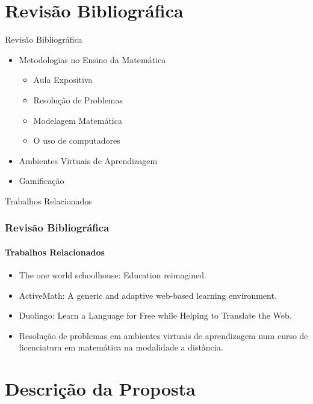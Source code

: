 \documentclass[aspectratio=169]{beamer}
\begin{document}
\section{Revisão Bibliográfica}

\begin{frame}{Revisão Bibliográfica}
  \begin{itemize}
  	\item Metodologias no Ensino da Matemática
    	\begin{itemize}
        	\item Aula Expositiva
            \item Resolução de Problemas
            \item Modelagem Matemática
            \item O uso de computadores
        \end{itemize}
    \item Ambientes Virtuais de Aprendizagem
    \item Gamificação 
  \end{itemize}
\end{frame}

\begin{frame}{Trabalhos Relacionados}
\frametitle{Revisão Bibliográfica}
\framesubtitle{Trabalhos Relacionados}

\begin{itemize}
	\item The one world schoolhouse: Education reimagined.
    \item ActiveMath: A generic and adaptive web-based learning environment.
    \item Duolingo: Learn a Language for Free while Helping to Translate the Web.
    \item Resolução de problemas em ambientes virtuais de aprendizagem num curso de licenciatura em matemática na modalidade a distância.
\end{itemize}

\end{frame}

\section{Descrição da Proposta}
\end{document}
